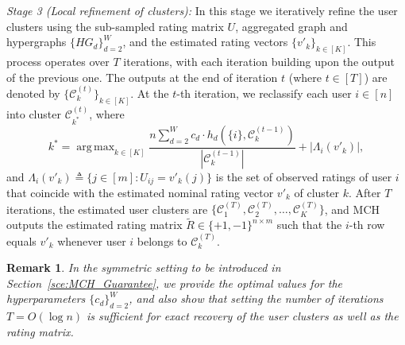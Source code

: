 \documentclass{article}
\DeclareMathOperator*{\argmax}{arg\,max}
\newtheorem{remark}{Remark}
\begin{document}
\emph{Stage 3 (Local refinement of clusters):}
In this stage we iteratively refine the user clusters using the sub-sampled rating matrix $U$, aggregated graph and hypergraphs $\{ HG_d \}_{d=2}^{W}$, and the estimated rating vectors $\{v'_k\}_{k \in [K]}$. This process operates over $T$ iterations, with each iteration building upon the output of the previous one. The outputs at the end of iteration $t$ (where $t \in [T]$) are denoted by $\{\mathcal{C}_k^{(t)}\}_{k \in [K]}$. At the $t$-th iteration, we reclassify each user $i \in [n]$ into cluster $\mathcal{C}_{k^*}^{(t)}$, where 
\begin{equation}\label{eq1}
 k^* = \argmax_{k \in [K]}	 \frac{ n \sum_{d=2}^{W} c_d \cdot h_d (\{i\}, \mathcal{C}_k^{(t-1)})}{|\mathcal{C}_{k}^{(t-1)}|}  + |\Lambda_{i}(v'_k)|,
\end{equation}
and $\Lambda_{i}(v'_k) \triangleq \{j \in [m]: U_{ij} = v'_k(j) \}$ is the set of observed ratings of user $i$ that coincide with the estimated nominal rating vector $v'_k$ of cluster $k$. After $T$ iterations, the estimated user clusters are $\{\mathcal{C}_1^{(T)}, \mathcal{C}_2^{(T)}, \ldots, \mathcal{C}_K^{(T)} \}$, and  MCH outputs the estimated rating matrix $\widetilde{R} \in \{+1,-1\}^{n \times m}$ such that the $i$-th row equals $v'_k$ whenever user $i$ belongs to $\mathcal{C}_k^{(T)}$.

\begin{remark}
In the symmetric setting to be introduced in Section~\ref{sce:MCH_Guarantee}, we provide the optimal values for the hyperparameters $\{c_d\}_{d=2}^W$, and also show that setting the number of iterations $T = O(\log n)$ is sufficient for exact recovery of the user clusters as well as the rating matrix.
\end{remark}
\end{document}
